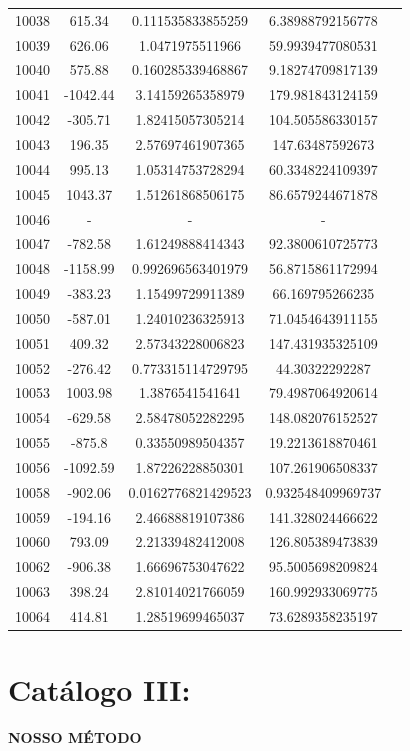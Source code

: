 {\begin{longtable}{ccccc}
10038 & 615.34 & 0.111535833855259 & 6.38988792156778 \\
10039 & 626.06 & 1.0471975511966 & 59.9939477080531 \\
10040 & 575.88 & 0.160285339468867 & 9.18274709817139 \\
10041 & -1042.44 & 3.14159265358979 & 179.981843124159 \\
10042 & -305.71 & 1.82415057305214 & 104.505586330157 \\
10043 & 196.35 & 2.57697461907365 & 147.63487592673 \\
10044 & 995.13 & 1.05314753728294 & 60.3348224109397 \\
10045 & 1043.37 & 1.51261868506175 & 86.6579244671878 \\
10046 & - & - &  -  \\
10047 & -782.58 & 1.61249888414343 & 92.3800610725773 \\
10048 & -1158.99 & 0.992696563401979 & 56.8715861172994 \\
10049 & -383.23 & 1.15499729911389 & 66.169795266235 \\
10050 & -587.01 & 1.24010236325913 & 71.0454643911155 \\
10051 & 409.32 & 2.57343228006823 & 147.431935325109 \\
10052 & -276.42 & 0.773315114729795 & 44.30322292287 \\
10053 & 1003.98 & 1.3876541541641 & 79.4987064920614 \\
10054 & -629.58 & 2.58478052282295 & 148.082076152527 \\
10055 & -875.8 & 0.33550989504357 & 19.2213618870461 \\
10056 & -1092.59 & 1.87226228850301 & 107.261906508337 \\
10058 & -902.06 & 0.0162776821429523 & 0.932548409969737 \\
10059 & -194.16 & 2.46688819107386 & 141.328024466622 \\
10060 & 793.09 & 2.21339482412008 & 126.805389473839 \\
10062 & -906.38 & 1.66696753047622 & 95.5005698209824 \\
10063 & 398.24 & 2.81014021766059 & 160.992933069775 \\
10064 & 414.81 & 1.28519699465037 & 73.6289358235197 \\ \hline
\end{longtable}
}

\section{Catálogo III: }
\textbf{NOSSO MÉTODO}

